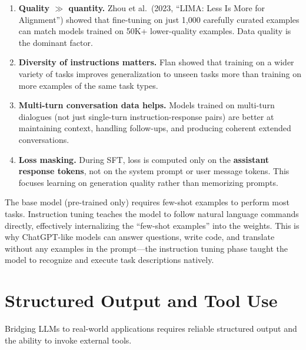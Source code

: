 \begin{enumerate}[leftmargin=*]
\item \textbf{Quality $\gg$ quantity.}  Zhou et al.\ (2023, ``LIMA: Less Is
  More for Alignment'') showed that fine-tuning on just 1,000 carefully
  curated examples can match models trained on 50K+ lower-quality examples.
  Data quality is the dominant factor.

\item \textbf{Diversity of instructions matters.}  Flan showed that training
  on a wider variety of tasks improves generalization to unseen tasks more
  than training on more examples of the same task types.

\item \textbf{Multi-turn conversation data helps.}  Models trained on
  multi-turn dialogues (not just single-turn instruction-response pairs)
  are better at maintaining context, handling follow-ups, and producing
  coherent extended conversations.

\item \textbf{Loss masking.}  During SFT, loss is computed only on the
  \textbf{assistant response tokens}, not on the system prompt or user
  message tokens.  This focuses learning on generation quality rather than
  memorizing prompts.
\end{enumerate}

\begin{keyinsight}
The base model (pre-trained only) requires few-shot examples to perform most
tasks.  Instruction tuning teaches the model to follow natural language
commands directly, effectively internalizing the ``few-shot examples'' into
the weights.  This is why ChatGPT-like models can answer questions, write
code, and translate without any examples in the prompt---the instruction
tuning phase taught the model to recognize and execute task descriptions
natively.
\end{keyinsight}


\section{Structured Output and Tool Use}
\label{sec:tool_use}

Bridging LLMs to real-world applications requires reliable structured output
and the ability to invoke external tools.

